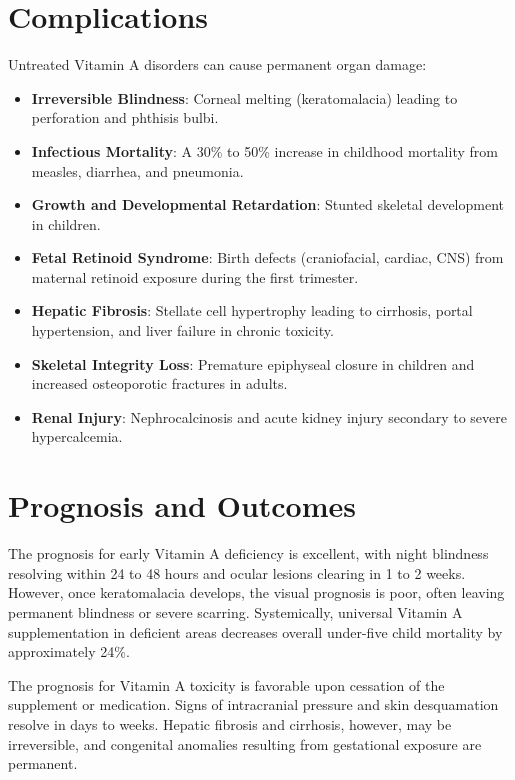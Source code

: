 \section*{Complications}
Untreated Vitamin A disorders can cause permanent organ damage:
\begin{itemize}
    \item \textbf{Irreversible Blindness}: Corneal melting (keratomalacia) leading to perforation and phthisis bulbi.
    \item \textbf{Infectious Mortality}: A 30\% to 50\% increase in childhood mortality from measles, diarrhea, and pneumonia.
    \item \textbf{Growth and Developmental Retardation}: Stunted skeletal development in children.
    \item \textbf{Fetal Retinoid Syndrome}: Birth defects (craniofacial, cardiac, CNS) from maternal retinoid exposure during the first trimester.
    \item \textbf{Hepatic Fibrosis}: Stellate cell hypertrophy leading to cirrhosis, portal hypertension, and liver failure in chronic toxicity.
    \item \textbf{Skeletal Integrity Loss}: Premature epiphyseal closure in children and increased osteoporotic fractures in adults.
    \item \textbf{Renal Injury}: Nephrocalcinosis and acute kidney injury secondary to severe hypercalcemia.
\end{itemize}

\section*{Prognosis and Outcomes}
The prognosis for early Vitamin A deficiency is excellent, with night blindness resolving within 24 to 48 hours and ocular lesions clearing in 1 to 2 weeks. However, once keratomalacia develops, the visual prognosis is poor, often leaving permanent blindness or severe scarring. Systemically, universal Vitamin A supplementation in deficient areas decreases overall under-five child mortality by approximately 24\%.

The prognosis for Vitamin A toxicity is favorable upon cessation of the supplement or medication. Signs of intracranial pressure and skin desquamation resolve in days to weeks. Hepatic fibrosis and cirrhosis, however, may be irreversible, and congenital anomalies resulting from gestational exposure are permanent.

